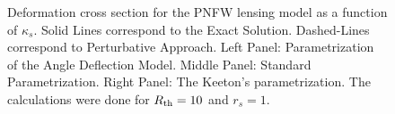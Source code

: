 \begin{figure}[!ht]
{}
\caption{\label{dcs_pnfw_re_pm} Deformation cross section for the  PNFW lensing
model as a function of $\kappa_s$. Solid Lines correspond to the Exact
Solution. Dashed-Lines correspond to Perturbative Approach. Left Panel:
Parametrization of the Angle Deflection Model. Middle Panel: Standard
Parametrization. Right Panel: The Keeton's parametrization.  The calculations
were done for $R_{\rm th}=10$ and $r_s=1$.}
\end{figure}

